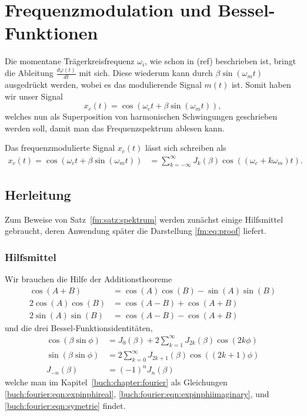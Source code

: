 %
%
%
\section{Frequenzmodulation und Bessel-Funktionen
\label{fm:section:proof}}
Die momentane Trägerkreisfrequenz \(\omega_i\), wie schon in (ref) beschrieben ist, bringt die Ableitung \(\frac{d \varphi(t)}{dt}\) mit sich.
Diese wiederum kann durch \(\beta\sin(\omega_mt)\) ausgedrückt werden, wobei es das modulierende Signal \(m(t)\) ist.
Somit haben wir unser Signal
\[
x_c(t)
=
\cos(\omega_c t+\beta\sin(\omega_mt)),
\]
welches nun als Superposition von harmonischen Schwingungen
geschrieben werden soll, damit man das Frequenzspektrum ablesen 
kann.

\begin{satz}
\label{fm:satz:spektrum}
Das frequenzmodulierte Signal $x_c(t)$ lässt sich schreiben als
\begin{align}
    x_c(t)
    = 
    \cos(\omega_ct+\beta\sin(\omega_mt))
    &=
    \sum_{k= -\infty}^\infty J_{k}(\beta) \cos((\omega_c+k\omega_m)t).
    \label{fm:eq:proof}
\end{align}
\end{satz}

\subsection{Herleitung}
Zum Beweise von Satz~\ref{fm:satz:spektrum} werden zunächst einige
Hilfsmittel gebraucht, deren Anwendung später die Darstellung
\eqref{fm:eq:proof} liefert.

\subsubsection{Hilfsmittel}
Wir brauchen die Hilfe der Additionstheoreme 
\begin{align}
    \cos(A + B) 
    &= 
    \cos(A)\cos(B)-\sin(A)\sin(B)
    \label{fm:eq:addth1}
    \\
    2\cos (A)\cos (B)
    &=
    \cos(A-B)+\cos(A+B)
    \label{fm:eq:addth2}
    \\
    2\sin(A)\sin(B)
    &=
    \cos(A-B)-\cos(A+B)
    \label{fm:eq:addth3}
\end{align}
und die drei Bessel-Funktionsidentitäten,
\begin{align}
    \cos(\beta\sin\phi)
    &=
    J_0(\beta) + 2\sum_{k=1}^\infty J_{2k}(\beta) \cos(2k\phi)
    \label{fm:eq:besselid1}
    \\
    \sin(\beta\sin\phi)
    &=
    2\sum_{k=0}^\infty J_{2k+1}(\beta) \cos((2k+1)\phi)
    \label{fm:eq:besselid2}
    \\
    J_{-n}(\beta) &= (-1)^n J_n(\beta)
    \label{fm:eq:besselid3}
\end{align}
welche man im Kapitel~\ref{buch:chapter:fourier}
als Gleichungen
\eqref{buch:fourier:eqn:expinphireal},
\eqref{buch:fourier:eqn:expinphiimaginary},
und \eqref{buch:fourier:eqn:symetrie} findet.

